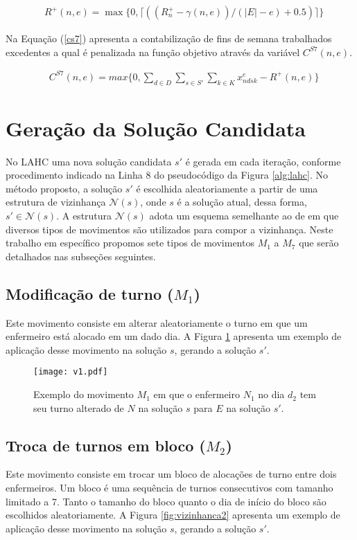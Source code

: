 \documentclass[cic,tc, twoside]{iiufrgs}
\begin{document}
\begin{align}
&R^{+}(n,e) = \max\{0, \lceil (( R^+_{n} - \gamma(n,e)) / (|E|-e) +0.5)\rceil\}  \label{rs7}
\end{align}

Na Equação (\ref{cs7}) apresenta a contabilização de fins de semana trabalhados excedentes a qual é penalizada na função objetivo através da variável $C^{S7}(n,e)$.

\begin{align}
& C^{S7}(n,e) = max\{0, \sum_{d \in D} \sum_{s \in S'}\sum_{k \in K} x^e_{ndsk} -  R^{+}(n,e)\}  \label{cs7}
\end{align}


\section{Geração da Solução Candidata} \label{SecVizinhança}

No LAHC uma nova solução candidata $s'$ é gerada em cada iteração, conforme procedimento indicado na Linha 8 do pseudocódigo da Figura \ref{alg:lahc}.
No método proposto, a solução $s'$ é escolhida aleatoriamente a partir de uma estrutura de vizinhança $\mathcal{N}(s)$, onde $s$ é a solução atual, dessa forma, $s' \in \mathcal{N}(s)$.
A estrutura $\mathcal{N}(s)$ adota um esquema semelhante ao de \citet{fonseca2016late} em que diversos tipos de movimentos são utilizados para compor a vizinhança. 
Neste trabalho em específico propomos sete tipos de movimentos $M_1$ a $M_7$ que serão detalhados nas subseções seguintes.

\subsection{Modificação de turno ($M_1$)}
Este movimento consiste em alterar aleatoriamente o turno em que um enfermeiro está alocado em um dado dia.
A Figura \ref{fig:vizinhanca1} apresenta um exemplo de aplicação desse movimento na solução $s$, gerando a solução $s'$. 

\begin{figure}[ht!]
\texttt{[image: v1.pdf]}
\centering
\caption{Exemplo do movimento $M_1$ em que o enfermeiro $N_1$ no dia $d_2$ tem seu turno alterado de $N$ na solução $s$ para $E$ na solução $s'$.}
\label{fig:vizinhanca1}
\end{figure}

\subsection{Troca de turnos em bloco ($M_2$)}
Este movimento consiste em trocar um bloco de alocações de turno entre dois enfermeiros. 
Um bloco é uma sequência de turnos consecutivos com tamanho limitado a 7.  
Tanto o tamanho do bloco quanto o dia de início do bloco são escolhidos aleatoriamente.
A Figura \ref{fig:vizinhanca2} apresenta um exemplo de aplicação desse movimento na solução $s$, gerando a solução $s'$. 
\end{document}

